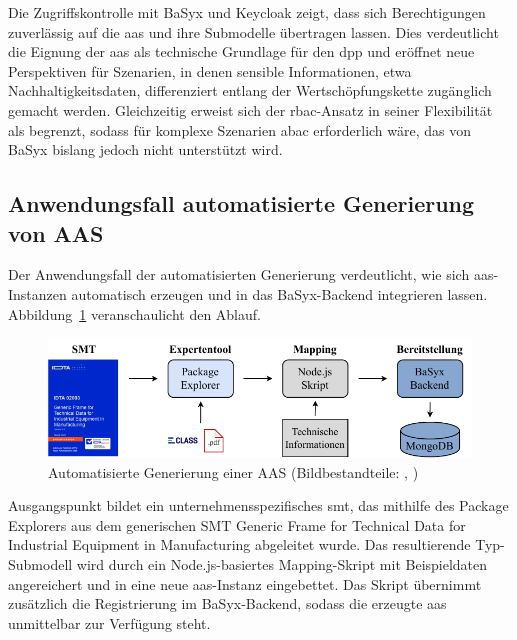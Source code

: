 Die Zugriffskontrolle mit BaSyx und Keycloak zeigt, dass sich Berechtigungen zuverlässig auf die \acs{aas} und ihre Submodelle übertragen lassen. 
Dies verdeutlicht die Eignung der \acs{aas} als technische Grundlage für den \acs{dpp} und eröffnet neue Perspektiven für Szenarien, in denen sensible Informationen, etwa Nachhaltigkeitsdaten, differenziert entlang der Wertschöpfungskette zugänglich gemacht werden. 
Gleichzeitig erweist sich der \acs{rbac}-Ansatz in seiner Flexibilität als begrenzt, sodass für komplexe Szenarien \acs{abac} erforderlich wäre, das von BaSyx bislang jedoch nicht unterstützt wird.

\newpage
\subsection{Anwendungsfall automatisierte Generierung von AAS}

Der Anwendungsfall der automatisierten Generierung verdeutlicht, wie sich \acs{aas}-In\-stanzen automatisch erzeugen und in das BaSyx-Backend integrieren lassen.
Abbildung~\ref{fig:AutomatisierteGenerierungAblauf} veranschaulicht den Ablauf.

\vspace{-0.5em}
\begin{figure}[htbp]
    \centering
        \includegraphics[width=\textwidth]{Bilder/ErgebnisseAutomatisierteGenerierung/ARchitekturTest.pdf}
    \caption[Automatisierte Generierung einer AAS]{Automatisierte Generierung einer AAS (Bildbestandteile: \cite{SpezifikaitonTechnischeDaten}, \cite{ECLASSLogo})}
    \label{fig:AutomatisierteGenerierungAblauf}
\end{figure}
\vspace{-0.5em}

Ausgangspunkt bildet ein unternehmensspezifisches \acs{smt}, das mithilfe des Package 
\linebreak
Explorers aus dem generischen SMT Generic Frame for Technical Data for Industrial
\linebreak
Equipment in Manufacturing \cite{SpezifikaitonTechnischeDaten} abgeleitet wurde.
Das resultierende Typ-Submodell wird durch ein Node.js-basiertes Mapping-Skript mit Beispieldaten angereichert und in eine neue \acs{aas}-Instanz eingebettet. 
Das Skript übernimmt zusätzlich die Registrierung im BaSyx-Backend, sodass die erzeugte \acs{aas} unmittelbar zur Verfügung steht.

